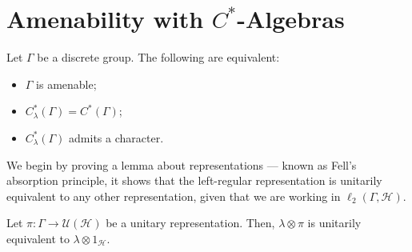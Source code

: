 \documentclass[10pt]{mypackage}
\begin{document}
\section{Amenability with \texorpdfstring{$C^{\ast}$-Algebras}{C*-Algebras}}%
\begin{theorem}
  Let $\Gamma$ be a discrete group. The following are equivalent:
  \begin{itemize}
    \item $\Gamma$ is amenable;
    \item $C^{\ast}_{\lambda}\left( \Gamma \right) = C^{\ast}\left( \Gamma \right)$;
    \item $C^{\ast}_{\lambda}\left( \Gamma \right)$ admits a character.
  \end{itemize}
\end{theorem}
We begin by proving a lemma about representations --- known as Fell's absorption principle, it shows that the left-regular representation is unitarily equivalent to any other representation, given that we are working in $\ell_2\left( \Gamma,\mathcal{H} \right)$.
\begin{theorem}
  Let $\pi\colon\Gamma\rightarrow \mathcal{U}\left( \mathcal{H} \right)$ be a unitary representation. Then, $\lambda\otimes \pi$ is unitarily equivalent to $\lambda\otimes 1_{\mathcal{H}}$.
\end{theorem}
\end{document}
